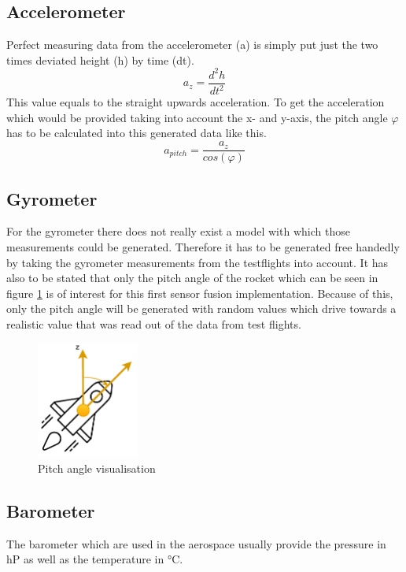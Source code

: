   \subsection{Accelerometer}
  Perfect measuring data from the accelerometer (a) is simply put just the two times deviated height (h) by time (dt).
  $$a_z = \frac{d^2h}{dt^2}$$
  This value equals to the straight upwards acceleration. To get the acceleration which would be provided taking into account the x- and y-axis,
  the pitch angle $\varphi$ has to be calculated into this generated data like this.
  $$a_{pitch} = \frac{a_z}{cos(\varphi)} $$

  \subsection{Gyrometer}
  For the gyrometer there does not really exist a model with which those measurements could be generated.
  Therefore it has to be generated free handedly by taking the gyrometer measurements from the testflights into account.
  It has also to be stated that only the pitch angle of the rocket which can be seen in figure \ref{fig:RocketPitchAngle} is of interest for this first sensor fusion implementation.
  Because of this, only the pitch angle will be generated with random values which drive towards a realistic value that was read out of the data from test flights.

  \begin{figure}[h!]
    \centering
    \includegraphics[width = 0.3\textwidth]{./Pictures/RocketSyMod.pdf}
    \caption{Pitch angle visualisation}
    \label{fig:RocketPitchAngle}
  \end{figure}

  \newpage
  \subsection{Barometer}
  The barometer which are used in the aerospace usually provide the pressure in hP as well as the temperature in °C.
